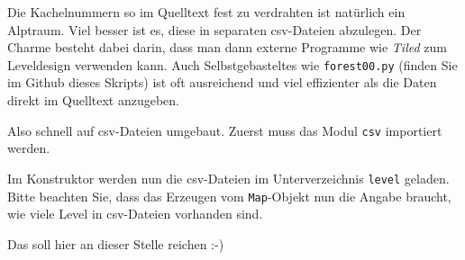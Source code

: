 Die Kachelnummern so im Quelltext fest zu verdrahten ist natürlich ein Alptraum. Viel besser ist es, diese in separaten csv-Dateien abzulegen. Der Charme besteht dabei darin, dass man dann externe Programme wie \emph{Tiled} zum Leveldesign verwenden kann. Auch Selbstgebasteltes wie \texttt{forest00.py} (finden Sie im Github dieses Skripts) ist oft ausreichend und viel effizienter als die Daten direkt im Quelltext anzugeben.

Also schnell auf csv-Dateien umgebaut. Zuerst muss das Modul \texttt{csv} importiert werden.


Im Konstruktor werden nun die csv-Dateien im Unterverzeichnis \texttt{level} geladen. Bitte beachten Sie, dass das Erzeugen vom \texttt{Map}-Objekt nun die Angabe braucht, wie viele Level in csv-Dateien vorhanden sind.


Das soll hier an dieser Stelle reichen :-)











